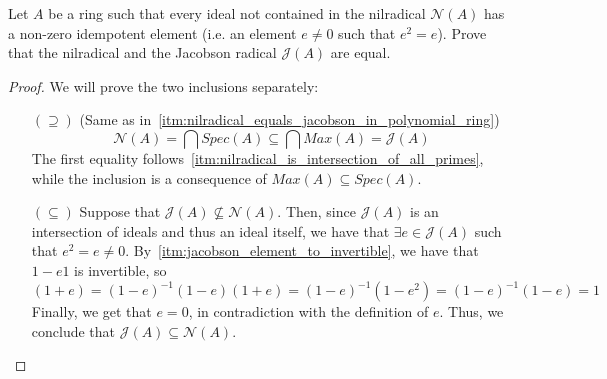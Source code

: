 \begin{problem}
    Let $A$ be a ring such that every ideal not contained in the nilradical $\mathcal{N}(A)$ has a non-zero idempotent element (i.e. an element $e \neq 0$ such that $e^2 = e$).
    Prove that the nilradical and the Jacobson radical $\mathcal{J}(A)$ are equal.
    \begin{sol}
        \begin{proof}
            We will prove the two inclusions separately:
                \begin{itemize}
                    \item[$(\supseteq)$]
                    (Same as in~\ref{itm:nilradical_equals_jacobson_in_polynomial_ring})
                    \[ \mathcal{N}(A) = \bigcap Spec(A) \subseteq \bigcap Max(A) = \mathcal{J}(A) \]
                    The first equality follows~\ref{itm:nilradical_is_intersection_of_all_primes}, while the inclusion is a consequence of $Max(A) \subseteq Spec(A)$.
                    \item[$(\subseteq)$]
                    Suppose that $\mathcal{J}(A) \nsubseteq \mathcal{N}(A)$.
                    Then, since $\mathcal{J}(A)$ is an intersection of ideals and thus an ideal itself, we have that $\exists e \in \mathcal{J}(A)$ such that $e^2 = e \neq 0$.
                    By~\ref{itm:jacobson_element_to_invertible}, we have that $1 - e 1$ is invertible, so
                    \[ (1 + e) = (1 - e)^{-1}(1 - e)(1 + e) = (1 - e)^{-1}(1 - e^2) = (1 - e)^{-1}(1 - e) = 1 \]
                    Finally, we get that $e = 0$, in contradiction with the definition of $e$.
                    Thus, we conclude that $\mathcal{J}(A) \subseteq \mathcal{N}(A)$.
                \end{itemize}
        \end{proof}
    \end{sol}
\end{problem}

